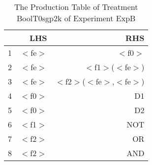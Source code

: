 \begin{table}[ht]
\centering
\begin{tabular}{rrr}
  \hline
 & LHS & RHS \\ 
  \hline
1 & $<$fe$>$ & $<$f0$>$ \\ 
  2 & $<$fe$>$ & $<$f1$>$($<$fe$>$) \\ 
  3 & $<$fe$>$ & $<$f2$>$($<$fe$>$,$<$fe$>$) \\ 
  4 & $<$f0$>$ & D1 \\ 
  5 & $<$f0$>$ & D2 \\ 
  6 & $<$f1$>$ & NOT \\ 
  7 & $<$f2$>$ & OR \\ 
  8 & $<$f2$>$ & AND \\ 
   \hline
\end{tabular}
\caption{The Production Table of Treatment BoolT0sgp2k of Experiment ExpB} 
\end{table}
